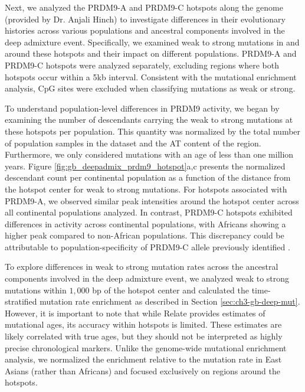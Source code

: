 Next, we analyzed the PRDM9-A and PRDM9-C hotspots along the genome (provided by Dr. Anjali Hinch) to investigate differences in their evolutionary histories across various populations and ancestral components involved in the deep admixture event. Specifically, we examined weak to strong mutations in and around these hotspots and their impact on different populations. PRDM9-A and PRDM9-C hotspots were analyzed separately, excluding regions where both hotspots occur within a 5kb interval. Consistent with the mutational enrichment analysis, CpG sites were excluded when classifying mutations as weak or strong. 

To understand population-level differences in PRDM9 activity, we began by examining the number of descendants carrying the weak to strong mutations at these hotspots per population. This quantity was normalized by the total number of population samples in the dataset and the AT content of the region. Furthermore, we only considered mutations with an age of less than one million years. Figure \ref{fig:gb_deepadmix_prdm9_hotspot}a,c presents the normalized descendant count per continental population as a function of the distance from the hotspot center for weak to strong mutations. For hotspots associated with PRDM9-A, we observed similar peak intensities around the hotspot center across all continental populations analyzed. In contrast, PRDM9-C hotspots exhibited differences in activity across continental populations, with Africans showing a higher peak compared to non-African populations. This discrepancy could be attributable to population-specificity of PRDM9-C allele previously identified \cite{hinch2011landscape, alleva2021cataloging}.

To explore differences in weak to strong mutation rates across the ancestral components involved in the deep admixture event, we analyzed weak to strong mutations within $1{,}000$ bp of the hotspot center and calculated the time-stratified mutation rate enrichment as described in Section \ref{sec:ch3-gb-deep-mut}. However, it is important to note that while Relate provides estimates of mutational ages, its accuracy within hotspots is limited. These estimates are likely correlated with true ages, but they should not be interpreted as highly precise chronological markers. Unlike the genome-wide mutational enrichment analysis, we normalized the enrichment relative to the mutation rate in East Asians (rather than Africans) and focused exclusively on regions around the hotspots. 

